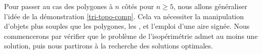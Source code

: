 Pour passer au cas des polygones à $n$ côtés pour $n \geq 5$, nous allons généraliser l'idée de la démonstration \ref{tri-topo-comp}. Cela va nécessiter la manipulation d'objets plus souples que les polygones, les \ncycles, et l'emploi d'une aire signée.
Nous commencerons par vérifier que le problème de l'isopérimétrie admet au moins une solution, puis nous partirons à la recherche des solutions optimales.
